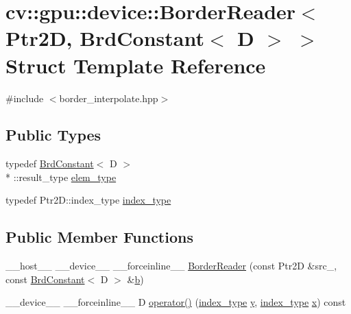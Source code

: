 \hypertarget{structcv_1_1gpu_1_1device_1_1BorderReader_3_01Ptr2D_00_01BrdConstant_3_01D_01_4_01_4}{\section{cv\-:\-:gpu\-:\-:device\-:\-:Border\-Reader$<$ Ptr2\-D, Brd\-Constant$<$ D $>$ $>$ Struct Template Reference}
\label{structcv_1_1gpu_1_1device_1_1BorderReader_3_01Ptr2D_00_01BrdConstant_3_01D_01_4_01_4}
}


{\ttfamily \#include $<$border\-\_\-interpolate.\-hpp$>$}

\subsection*{Public Types}
\begin{DoxyCompactItemize}
\item 
typedef \hyperlink{structcv_1_1gpu_1_1device_1_1BrdConstant}{Brd\-Constant}$<$ D $>$\\*
\-::result\-\_\-type \hyperlink{structcv_1_1gpu_1_1device_1_1BorderReader_3_01Ptr2D_00_01BrdConstant_3_01D_01_4_01_4_acd446c4cfb5a03a9dbda2998fdff16e1}{elem\-\_\-type}
\item 
typedef Ptr2\-D\-::index\-\_\-type \hyperlink{structcv_1_1gpu_1_1device_1_1BorderReader_3_01Ptr2D_00_01BrdConstant_3_01D_01_4_01_4_a45086495eea2ee4821dc4834dfe7b3a5}{index\-\_\-type}
\end{DoxyCompactItemize}
\subsection*{Public Member Functions}
\begin{DoxyCompactItemize}
\item 
\-\_\-\-\_\-host\-\_\-\-\_\- \-\_\-\-\_\-device\-\_\-\-\_\- \-\_\-\-\_\-forceinline\-\_\-\-\_\- \hyperlink{structcv_1_1gpu_1_1device_1_1BorderReader_3_01Ptr2D_00_01BrdConstant_3_01D_01_4_01_4_acde61ff46ed621d668f2fe7760488d9f}{Border\-Reader} (const Ptr2\-D \&src\-\_\-, const \hyperlink{structcv_1_1gpu_1_1device_1_1BrdConstant}{Brd\-Constant}$<$ D $>$ \&\hyperlink{legacy_8hpp_ac04272e8ca865b8fba18d36edae9fd2a}{b})
\item 
\-\_\-\-\_\-device\-\_\-\-\_\- \-\_\-\-\_\-forceinline\-\_\-\-\_\- D \hyperlink{structcv_1_1gpu_1_1device_1_1BorderReader_3_01Ptr2D_00_01BrdConstant_3_01D_01_4_01_4_a1a7f7d4acf807fade831fd022b04a4d3}{operator()} (\hyperlink{structcv_1_1gpu_1_1device_1_1BorderReader_3_01Ptr2D_00_01BrdConstant_3_01D_01_4_01_4_a45086495eea2ee4821dc4834dfe7b3a5}{index\-\_\-type} \hyperlink{highgui__c_8h_af1202c02b14870c18fb3a1da73e9e7c7}{y}, \hyperlink{structcv_1_1gpu_1_1device_1_1BorderReader_3_01Ptr2D_00_01BrdConstant_3_01D_01_4_01_4_a45086495eea2ee4821dc4834dfe7b3a5}{index\-\_\-type} \hyperlink{highgui__c_8h_a6150e0515f7202e2fb518f7206ed97dc}{x}) const 
\end{DoxyCompactItemize}
